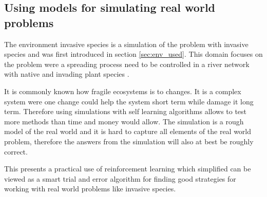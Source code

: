 \subsection{Using models for simulating real world problems}
\label{sec:ethics_inv_spec}


The environment invasive species is a simulation of the problem with invasive
species and was first introduced in section \ref{sec:env_used}. This domain
focuses on the problem were a spreading process need to be controlled in a
river network with native and invading plant species
\parencite{invasiveSpecis2014:Online}. 

It is commonly known how fragile ecosystems is to changes. It is a complex
system were one change could help the system short term while damage it long
term. Therefore using simulations with self learning algorithms allows to test
more methods than time and money would allow. The simulation is a rough model
of the real world and it is hard to capture all elements of the real world
problem, therefore the answers from the simulation will also at best be roughly
correct.

This presents a practical use of reinforcement learning which simplified can be
viewed as a smart trial and error algorithm for finding good strategies for
working with real world problems like invasive species.
